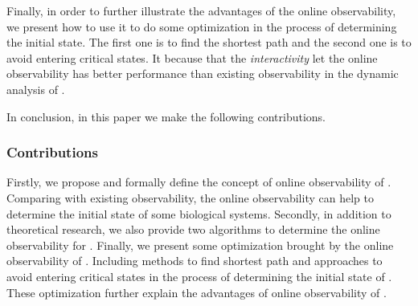 Finally, in order to further illustrate the advantages of the online observability, we present how to use it to do some optimization in the process of determining the initial state. The first one is to find the shortest path and the second one is to avoid entering critical states. It because that the {\em interactivity} let the online observability has better performance than existing observability in the dynamic analysis of \BCNs.

In conclusion, in this paper we make the following contributions. 


\subsubsection*{Contributions}
Firstly, we propose and formally define the concept of online observability of \BCNs. Comparing with existing observability, the online observability can help to determine the initial state of some biological systems. Secondly, in addition to theoretical research, we also provide two algorithms to determine the online observability for \BCNs. Finally, we present some optimization brought by the online observability of \BCNs. Including methods to find shortest path and approaches to avoid entering critical states in the process of determining the initial state of \BCNs.  These optimization further explain the advantages of online observability of \BCNs. %

